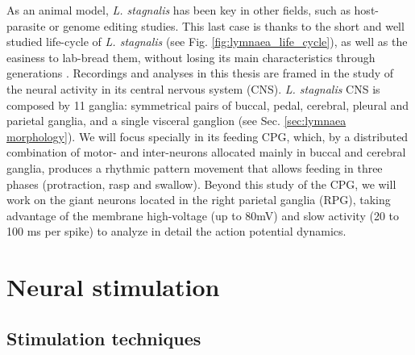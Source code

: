  As an animal model, \textit{L. stagnalis} has been key in other fields, such as host-parasite or genome editing studies. This last case is thanks to the short and well studied life-cycle of  \textit{L. stagnalis} (see Fig. \ref{fig:lymnaea_life_cycle}), as well as the easiness to lab-bread them, without losing its main characteristics through generations \parencite{noland_observations_1946}. Recordings and analyses in this thesis are framed in the study of the neural activity in its central nervous system (CNS). \textit{L. stagnalis} CNS is composed by 11 ganglia: symmetrical pairs of buccal, pedal, cerebral, pleural and parietal ganglia, and a single visceral ganglion (see Sec. \ref{sec:lymnaea morphology}). We will focus specially in its feeding CPG, which, by a distributed combination of motor- and inter-neurons allocated mainly in buccal and cerebral ganglia, produces a rhythmic pattern movement that allows feeding in three phases (protraction, rasp and swallow). Beyond this study of the CPG, we will work on the giant neurons located in the right parietal ganglia (RPG), taking advantage of the membrane high-voltage (up to 80mV) and slow activity (20 to 100 ms per spike) to analyze in detail the action potential dynamics. 


\section{Neural stimulation}
\subsection{Stimulation techniques}


